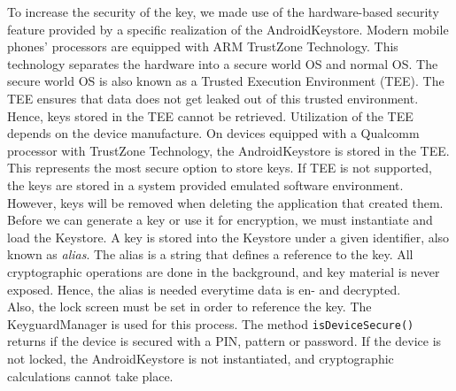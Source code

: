 To increase the security of the key, we made use of the hardware-based security feature provided by a specific realization of the AndroidKeystore. Modern mobile phones' processors are equipped with ARM TrustZone Technology. \cite{DBLP:conf/ccs/CooijmansRP14} This technology separates the hardware into a secure world OS and normal OS. The secure world OS is also known as a Trusted Execution Environment (TEE). The TEE ensures that data does not get leaked out of this trusted environment. Hence, keys stored in the TEE cannot be retrieved. Utilization of the TEE depends on the device manufacture. On devices equipped with a Qualcomm processor with TrustZone Technology, the AndroidKeystore is stored in the TEE. \cite{DBLP:conf/ccs/CooijmansRP14} This represents the most secure option to store keys. \cite{SecureDataEncryption} If TEE is not supported, the keys are stored in a system provided emulated software environment. However, keys will be removed when deleting the application that created them. \\

Before we can generate a key or use it for encryption, we must instantiate and load the Keystore.
A key is stored into the Keystore under a given identifier, also known as \textit{alias}. \cite{DBLP:conf/ccs/CooijmansRP14} The alias is a string that defines a reference to the key. All cryptographic operations are done in the background, and key material is never exposed. Hence, the alias is needed everytime data is en- and decrypted. \\

Also, the lock screen must be set in order to reference the key. The KeyguardManager is used for this process. The method \texttt{isDeviceSecure()} returns if the device is secured with a PIN, pattern or password. If the device is not locked, the AndroidKeystore is not instantiated, and cryptographic calculations cannot take place. \\





